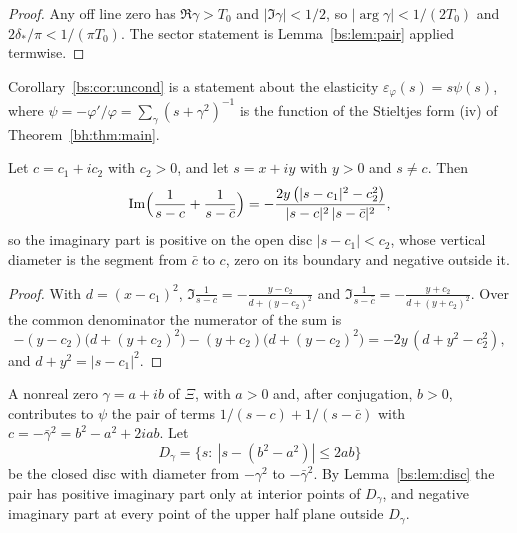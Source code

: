 \begin{proof}
Any off line zero has $\Re\gamma>T_0$ and $|\Im\gamma|<1/2$, so $|\arg\gamma|<1/(2T_0)$ and $2\delta_*/\pi<1/(\pi T_0)$. The sector statement is Lemma~\ref{bs:lem:pair} applied termwise.
\end{proof}

Corollary~\ref{bs:cor:uncond} is a statement about the elasticity $\varepsilon_\varphi(s)=s\psi(s)$, where $\psi=-\varphi'/\varphi=\sum_\gamma(s+\gamma^2)^{-1}$ is the function of the Stieltjes form (iv) of Theorem~\ref{bh:thm:main}.

\begin{lemma}\label{bs:lem:disc}
Let $c=c_1+ic_2$ with $c_2>0$, and let $s=x+iy$ with $y>0$ and $s\ne c$. Then
\[
\Im\Bigl(\frac1{s-c}+\frac1{s-\bar c}\Bigr)=-\frac{2y\,\bigl(|s-c_1|^2-c_2^2\bigr)}{|s-c|^2\,|s-\bar c|^2},
\]
so the imaginary part is positive on the open disc $|s-c_1|<c_2$, whose vertical diameter is the segment from $\bar c$ to $c$, zero on its boundary and negative outside it.
\end{lemma}

\begin{proof}
With $d=(x-c_1)^2$, $\Im\frac1{s-c}=-\frac{y-c_2}{d+(y-c_2)^2}$ and $\Im\frac1{s-\bar c}=-\frac{y+c_2}{d+(y+c_2)^2}$. Over the common denominator the numerator of the sum is
\[
-(y-c_2)\bigl(d+(y+c_2)^2\bigr)-(y+c_2)\bigl(d+(y-c_2)^2\bigr)=-2y\,(d+y^2-c_2^2),
\]
and $d+y^2=|s-c_1|^2$.
\end{proof}

A nonreal zero $\gamma=a+ib$ of $\Xi$, with $a>0$ and, after conjugation, $b>0$, contributes to $\psi$ the pair of terms $1/(s-c)+1/(s-\bar c)$ with $c=-\bar\gamma^2=b^2-a^2+2iab$. Let
\[
D_\gamma=\bigl\{s:\ |s-(b^2-a^2)|\le2ab\bigr\}
\]
be the closed disc with diameter from $-\gamma^2$ to $-\bar\gamma^2$. By Lemma~\ref{bs:lem:disc} the pair has positive imaginary part only at interior points of $D_\gamma$, and negative imaginary part at every point of the upper half plane outside $D_\gamma$.

